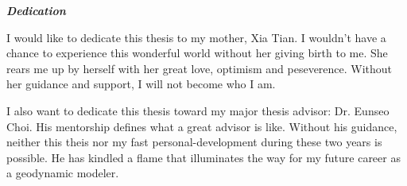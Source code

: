 \begin{center}
\textbf{\textit{Dedication}}
\end{center}

I would like to dedicate this thesis to my mother, Xia Tian. I wouldn't have a chance to experience this wonderful world without her giving birth to me. She rears me up by herself with her great love, optimism and peseverence. Without her guidance and support, I will not become who I am.

I also want to dedicate this thesis toward my major thesis advisor: Dr. Eunseo Choi. His mentorship defines what a great advisor is like. Without his  guidance, neither this theis nor my fast personal-development during these two years is possible. He has kindled a flame that illuminates the way for my future career as a geodynamic modeler.   

